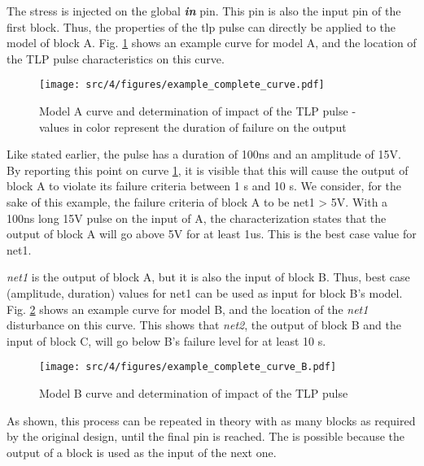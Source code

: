 The stress is injected on the global \textbf{\textit{in}} pin.
This pin is also the input pin of the first block.
Thus, the properties of the \gls{tlp} pulse can directly be applied to the model of block A.
Fig. \ref{example_complete_curve} shows an example curve for model A, and the location of the TLP pulse characteristics on this curve.

\begin{figure}[!h]
  \centering
  \texttt{[image: src/4/figures/example\_complete\_curve.pdf]}
  \caption{Model A curve and determination of impact of the TLP pulse - values in color represent the duration of failure on the output}
  \label{example_complete_curve}
\end{figure}

Like stated earlier, the pulse has a duration of 100ns and an amplitude of 15V. By reporting this point on curve \ref{example_complete_curve},
it is visible that this will cause the output of block A to violate its failure criteria between 1 \textmugreek{}s and 10 \textmugreek{}s.
We consider, for the sake of this example, the failure criteria of block A to be net1 > 5V.
With a 100ns long 15V pulse on the input of A, the characterization states that the output of block A will go above 5V for at least 1us.
This is the best case value for net1.

\textit{net1} is the output of block A, but it is also the input of block B.
Thus, best case (amplitude, duration) values for net1 can be used as input for block B's model.
Fig. \ref{example_complete_curve_B} shows an example curve for model B, and the location of the \textit{net1} disturbance on this curve.
This shows that \textit{net2}, the output of block B and the input of block C, will go below B's failure level for at least 10 \textmugreek{}s.

\begin{figure}[!h]
  \centering
  \texttt{[image: src/4/figures/example\_complete\_curve\_B.pdf]}
  \caption{Model B curve and determination of impact of the TLP pulse}
  \label{example_complete_curve_B}
\end{figure}

As shown, this process can be repeated in theory with as many blocks as required by the original design, until the final pin is reached.
The is possible because the output of a block is used as the input of the next one.



